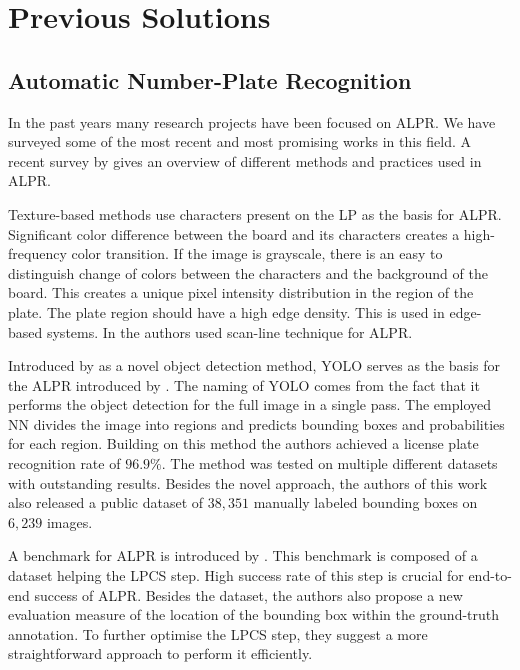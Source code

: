 \section{Previous Solutions}
\label{previous-solutions}

\subsection{Automatic Number-Plate Recognition}
\label{previous-solutions-anpr}
In the past years many research projects have been focused on \ac{ALPR}.
We have surveyed some of the most recent and most promising works in this field.
A recent survey by \cite{survOnMet} gives an overview of different methods and
practices used in \ac{ALPR}.

Texture-based methods use characters present on the \ac{LP} as the basis for
\ac{ALPR}. Significant color difference between the board and its characters
creates a high-frequency color transition. If the image is grayscale,
there is an easy to distinguish change of colors between the characters and the
background of the board. This creates a unique pixel intensity distribution in
the region of the plate. The plate region should have a high edge density. This
is used in edge-based systems. In \cite{HongFuJiaHuan} the authors used
scan-line technique for \ac{ALPR}.

Introduced by \cite{redmon2016look} as a novel object detection method,
\ac{YOLO} serves as the basis for the \ac{ALPR} introduced by
\cite{DBLP:journals/corr/abs-1909-01754}.
The naming of \ac{YOLO} comes from the fact that it performs the object detection
for the full image in a single pass. The employed \ac{NN} divides the image
into regions and predicts bounding boxes and probabilities for each region.
Building on this method the authors achieved a license plate recognition rate of
$96.9\%$.  The method was tested on multiple different datasets with outstanding
results.  Besides the novel approach, the authors of this work also released
a public dataset of $38,351$ manually labeled bounding boxes on $6,239$ images.

A benchmark for \ac{ALPR} is introduced by
\cite{DBLP:journals/corr/GoncalvesSMS16}. This benchmark is
composed of a dataset helping the \ac{LPCS} step. High success rate of this step
is crucial for end-to-end success of \ac{ALPR}. Besides the dataset, the authors
also propose a new evaluation measure of the location of the bounding
box within the ground-truth annotation. To further optimise the \ac{LPCS} step,
they suggest a more straightforward approach to perform it efficiently.

